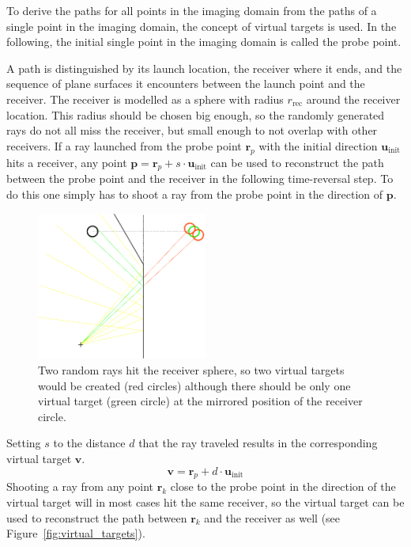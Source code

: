 To derive the paths for all points in the imaging domain from the paths of a single point in the imaging domain, the concept of virtual targets is used.
In the following, the initial single point in the imaging domain is called the probe point.

A path is distinguished by its launch location, the receiver where it ends, and the sequence of plane surfaces it encounters between the launch point and the receiver.
The receiver is modelled as a sphere with radius \(r_{\text{rec}}\) around the receiver location.
This radius should be chosen big enough, so the randomly generated rays do not all miss the receiver, but small enough to not overlap with other receivers.
If a ray launched from the probe point \(\bm{r}_p\) with the initial direction \(\bm{u}_{\text{init}}\) hits a receiver, any point \(\bm{p} = \bm{r}_p + s \cdot \bm{u}_{\text{init}}\) can be used to reconstruct the path between the probe point and the receiver in the following time-reversal step.
To do this one simply has to shoot a ray from the probe point in the direction of \(\bm{p}\).

\begin{figure}
    \centering
    \includegraphics[width=0.5\textwidth]{figures/VirtualTargetsMultiHit.pdf}
    \caption{Two random rays hit the receiver sphere, so two virtual targets would be created (red circles) although there should be only one virtual target (green circle) at the mirrored position of the receiver circle.}\label{fig:mulithit}
\end{figure}

Setting \(s\) to the distance \(d\) that the ray traveled results in the corresponding virtual target \(\bm{v}\).
\begin{equation}\label{eq:visual_target}
    \bm{v} = \bm{r}_p + d \cdot \bm{u}_{\text{init}}
\end{equation}
Shooting a ray from any point \(\bm{r}_k\) close to the probe point in the direction of the virtual target will in most cases hit the same receiver, so the virtual target can be used to reconstruct the path between \(\bm{r}_k\) and the receiver as well  (see Figure~\ref{fig:virtual_targets}).


